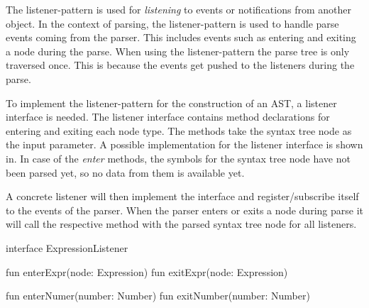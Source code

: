 The listener-pattern is used for \textit{listening} to events or notifications from another object. In the context of parsing, the listener-pattern is used to handle parse events coming from the parser. This includes events such as entering and exiting a node during the parse. When using the listener-pattern the parse tree is only traversed once. This is because the events get pushed to the listeners during the parse. 

To implement the listener-pattern for the construction of an AST, a listener interface is needed. The listener interface contains method declarations for entering and exiting each node type. The methods take the syntax tree node as the input parameter. A possible implementation for the listener interface is shown in.  In case of the \textit{enter} methods, the symbols for the syntax tree node have not been parsed yet, so no data from them is available yet.

A concrete listener will then implement the interface and register/subscribe itself to the events of the parser. When the parser enters or exits a node during parse it will call the respective method with the parsed syntax tree node for all listeners. 

\begin{KotlinCode}[float,numbers=none,caption=Implementation of the \texttt{ExpressionListener} interface., label=lst:ListPatExprList]
interface ExpressionListener {
    fun enterExpr(node: Expression)
    fun exitExpr(node: Expression)

    fun enterNumer(number: Number)
    fun exitNumber(number: Number)
}
  \end{KotlinCode}

